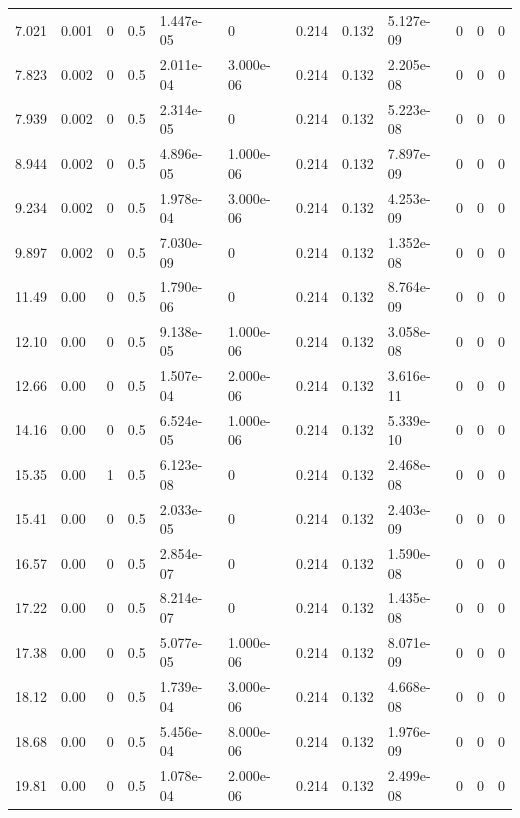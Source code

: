 \documentclass[preview]{standalone}
\begin{document}
{{\begin{tabular}{L{1.2cm}C{1.2cm} C{0.3cm}C{0.5cm} C{1.4cm}C{1.4cm} C{1.4cm}C{1.4cm} C{1.6cm}C{1.6cm} C{1.6cm}C{1.6cm}}
  7.021  &  0.001  & 0     & 0.5 &  1.447e-05  & 0  &  0.214&   0.132& 5.127e-09 & 0   &  0 & 0  \\ 
  7.823  &  0.002  & 0     & 0.5 &  2.011e-04  & 3.000e-06  &  0.214&   0.132& 2.205e-08 & 0   &  0 & 0  \\ 
  7.939  &  0.002  & 0     & 0.5 &  2.314e-05  & 0  &  0.214&   0.132& 5.223e-08 & 0   &  0 & 0  \\ 
  8.944  &  0.002  & 0     & 0.5 &  4.896e-05  & 1.000e-06  &  0.214&   0.132& 7.897e-09 & 0   &  0 & 0  \\ 
  9.234  &  0.002  & 0     & 0.5 &  1.978e-04  & 3.000e-06  &  0.214&   0.132& 4.253e-09 & 0   &  0 & 0  \\ 
  9.897  &  0.002  & 0     & 0.5 &  7.030e-09  & 0  &  0.214&   0.132& 1.352e-08 & 0   &  0 & 0  \\ 
  11.49  &  0.00  & 0     & 0.5 &  1.790e-06  & 0  &  0.214&   0.132& 8.764e-09 & 0   &  0 & 0  \\ 
  12.10  &  0.00  & 0     & 0.5 &  9.138e-05  & 1.000e-06  &  0.214&   0.132& 3.058e-08 & 0   &  0 & 0  \\ 
  12.66  &  0.00  & 0     & 0.5 &  1.507e-04  & 2.000e-06  &  0.214&   0.132& 3.616e-11 & 0   &  0 & 0  \\ 
  14.16  &  0.00  & 0     & 0.5 &  6.524e-05  & 1.000e-06  &  0.214&   0.132& 5.339e-10 & 0   &  0 & 0  \\ 
  15.35  &  0.00  & 1     & 0.5 &  6.123e-08  & 0  &  0.214&   0.132& 2.468e-08 & 0   &  0 & 0  \\ 
  15.41  &  0.00  & 0     & 0.5 &  2.033e-05  & 0  &  0.214&   0.132& 2.403e-09 & 0   &  0 & 0  \\ 
  16.57  &  0.00  & 0     & 0.5 &  2.854e-07  & 0  &  0.214&   0.132& 1.590e-08 & 0   &  0 & 0  \\ 
  17.22  &  0.00  & 0     & 0.5 &  8.214e-07  & 0  &  0.214&   0.132& 1.435e-08 & 0   &  0 & 0  \\ 
  17.38  &  0.00  & 0     & 0.5 &  5.077e-05  & 1.000e-06  &  0.214&   0.132& 8.071e-09 & 0   &  0 & 0  \\ 
  18.12  &  0.00  & 0     & 0.5 &  1.739e-04  & 3.000e-06  &  0.214&   0.132& 4.668e-08 & 0   &  0 & 0  \\ 
  18.68  &  0.00  & 0     & 0.5 &  5.456e-04  & 8.000e-06  &  0.214&   0.132& 1.976e-09 & 0   &  0 & 0  \\ 
  19.81  &  0.00  & 0     & 0.5 &  1.078e-04  & 2.000e-06  &  0.214&   0.132& 2.499e-08 & 0   &  0 & 0  \\ 

\end{tabular}}}
\end{document}
